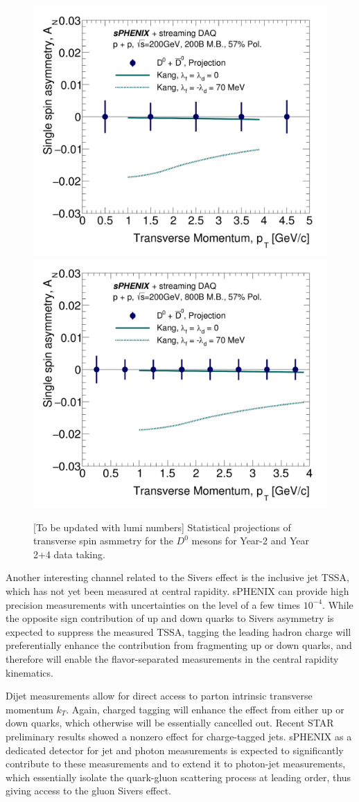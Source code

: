 \begin{figure}[htbp]
\begin{center}
\includegraphics[width=.49\linewidth]{figs/RAA_DB_theory_root_AN_D0D0bar_pp200B.pdf}
\includegraphics[width=.49\linewidth]{figs/RAA_DB_theory_root_AN_D0D0bar.pdf}
\caption{[To be updated with lumi numbers] Statistical projections of transverse spin asmmetry for the $D^0$ mesons for Year-2 and Year 2+4 data taking.}
\label{fig:AN-D0}
\end{center}
\end{figure}

Another interesting channel related to the Sivers effect is the inclusive jet TSSA, which has not yet been measured at central rapidity. sPHENIX can provide high precision measurements with uncertainties on the level of a few times $10^{-4}$. While the opposite sign contribution of up and down quarks to Sivers asymmetry is expected to suppress the measured TSSA, tagging the leading hadron charge will preferentially enhance the contribution from fragmenting up or down quarks, and therefore will enable the flavor-separated measurements in the central rapidity kinematics.

Dijet measurements allow for direct access to parton intrinsic transverse momentum $k_T$. Again, charged tagging will enhance the effect from either up or down quarks, which otherwise will be essentially cancelled out. Recent STAR preliminary results showed a nonzero effect for charge-tagged jets. sPHENIX as a dedicated detector for jet and photon measurements is expected to significantly contribute to these measurements and to extend it to photon-jet measurements, which essentially isolate the quark-gluon scattering process at leading order, thus giving access to the gluon Sivers effect.


